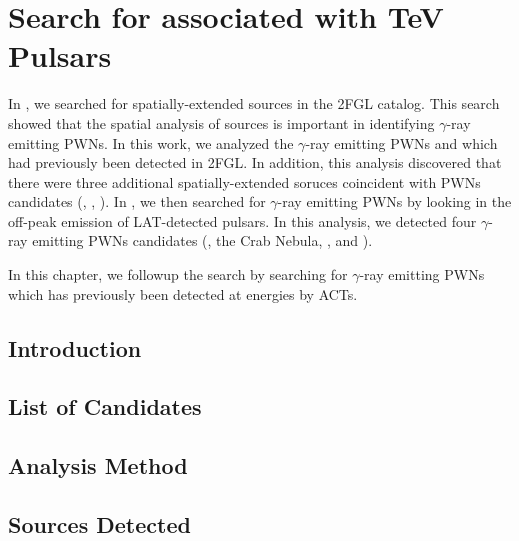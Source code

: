 \chapter{Search for  associated with TeV Pulsars}


In , we searched for spatially-extended sources
in the 2FGL catalog.  This search showed that the spatial analysis of
\fermi sources is important in identifying $\gamma$-ray emitting \acp{PWN}.
In this work, we analyzed the $\gamma$-ray emitting \acp{PWN} 
and \mshfifteenfiftytwo which had previously been detected in \ac{2FGL}.
In addition, this analysis discovered that there were three additional
spatially-extended \fermi soruces coincident with \acp{PWN} candidates
(, , ).
In , we then searched for $\gamma$-ray emitting \acp{PWN}
by looking in the off-peak emission of \ac{LAT}-detected
pulsars. In this analysis, we detected four $\gamma$-ray emitting \acp{PWN}
candidates (\velax, the Crab Nebula, \mshfifteenfiftytwo, and \threecfiftyeight).

In this chapter, we followup the search by searching for $\gamma$-ray
emitting \acp{PWN} which has previously been detected at \tev energies
by \acp{ACT}.

\section{Introduction}

\section{List of Candidates}

\section{Analysis Method}

\section{Sources Detected}
